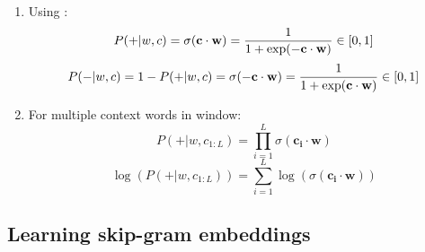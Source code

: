 \begin{enumerate}
    \item Using :
    \[
        \displaystyle P(+|w, c) = \sigma(\mathbf{c\cdot w}) = \dfrac{1}{1 + \exp(-\mathbf{c\cdot w})} \hfill \in [0,1]
    \]
    \[
        P(-|w, c) = 1 - P(+|w, c) = \sigma(\mathbf{-c\cdot w}) = \dfrac{1}{1 + \exp(\mathbf{c\cdot w})} \hfill \in [0,1]
    \]

    \item For multiple context words in window:
    \[
        \displaystyle P(+|w, c_{1:L}) = \prod_{i=1}^{L} \sigma(\mathbf{c_i\cdot w})
    \]
    \[
        \displaystyle \log(P(+|w, c_{1:L})) = \sum_{i=1}^{L} \log(\sigma(\mathbf{c_i\cdot w}))
    \]

    
\end{enumerate}


\subsection{Learning skip-gram embeddings \cite{nlp-1}}

